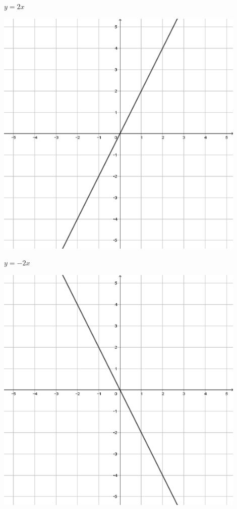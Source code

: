 \documentclass[a4paper]{oblivoir}
\begin{document}
\begin{minipage}{0.45\textwidth}\centering
\(y=2x\)
\par\bigskip\includegraphics[width=0.9\textwidth]{img/1_line_3}
\end{minipage}
\begin{minipage}{0.45\textwidth}\centering
\(y=-2x\)
\par\bigskip\includegraphics[width=0.9\textwidth]{img/1_line_4}
\end{minipage}\bigskip\bigskip\par
\end{document}
